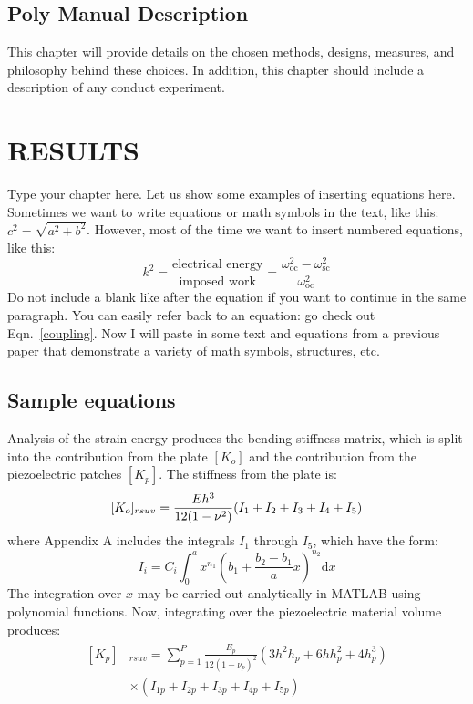 \documentclass[thesis]{fputhesis}
\begin{document}
\begin{body}
\section{Poly Manual Description}
This chapter will provide details on the chosen methods, designs, measures, and philosophy behind these choices. In addition, this chapter should include a description of any conduct experiment.







\chapter{RESULTS}
Type your chapter here. Let us show some examples of inserting equations here. Sometimes we want to write equations or math symbols in the text, like this: $c^2=\sqrt{a^2+b^2}$. However, most of the time we want to insert numbered equations, like this:
\begin{equation}\label{coupling}
k^2=\frac{\text{electrical energy}}{\text{imposed work}}=\frac{\omega^2_{\text{oc}}-\omega^2_{\text{sc}}}{\omega^2_{\text{oc}}}
\end{equation}
Do not include a blank like after the equation if you want to continue in the same paragraph. You can easily refer back to an equation: go check out Eqn.~\eqref{coupling}. Now I will paste in some text and equations from a previous paper that demonstrate a variety of math symbols, structures, etc. 


\section{Sample equations}
Analysis of the strain energy produces the bending stiffness matrix, which is split into the contribution from the plate $[K_o]$ and the contribution from the piezoelectric patches $[K_p]$. The stiffness from the plate is:
\begin{equation}\label{Stiffness}
[K_o]_{rsuv}=\frac{Eh^3}{12(1-\nu^2)}(I_1+I_2+I_3+I_4+I_5) \\
\end{equation}
where Appendix A includes the integrals $I_1$ through $I_5$, which have the form:
\begin{equation}
I_i=C_i\int_0^a x^{n_1}(b_1+\frac{b_2-b_1}{a}x)^{n_2} \text{d}x
\end{equation}
The integration over $x$ may be carried out analytically in MATLAB using polynomial functions. Now, integrating over the piezoelectric material volume produces:
\begin{align}\label{PiezoStiffness}
\begin{split}
[K_p]&_{rsuv}=\sum_{p=1}^P \frac{E_p}{12(1-\nu_p)^2} (3h^2 h_p+6h h_p^2+4h_p^3) \\
&\times (I_{1p}+I_{2p}+I_{3p}+I_{4p}+I_{5p})
\end{split}
\end{align}


\end{body}
\end{document}
